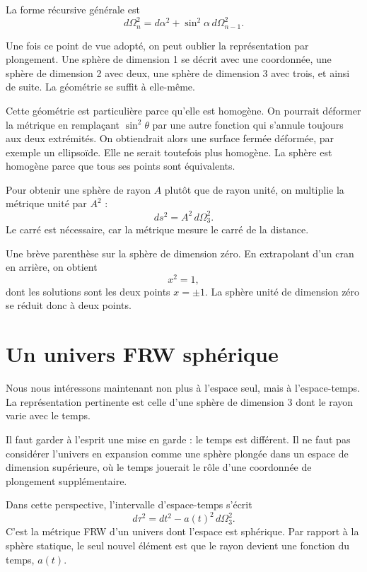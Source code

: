 La forme récursive générale est
\begin{equation}
d\Omega_n^2=d\alpha^2+\sin^2\alpha\,d\Omega_{n-1}^2.
\end{equation}

Une fois ce point de vue adopté, on peut oublier la représentation par plongement. Une sphère de dimension 1 se décrit avec une coordonnée, une sphère de dimension 2 avec deux, une sphère de dimension 3 avec trois, et ainsi de suite. La géométrie se suffit à elle-même.

Cette géométrie est particulière parce qu’elle est homogène. On pourrait déformer la métrique en remplaçant \(\sin^2\theta\) par une autre fonction qui s’annule toujours aux deux extrémités. On obtiendrait alors une surface fermée déformée, par exemple un ellipsoïde. Elle ne serait toutefois plus homogène. La sphère est homogène parce que tous ses points sont équivalents.

Pour obtenir une sphère de rayon \(A\) plutôt que de rayon unité, on multiplie la métrique unité par \(A^2\) :
\begin{equation}
ds^2=A^2\,d\Omega_3^2.
\end{equation}
Le carré est nécessaire, car la métrique mesure le carré de la distance.

Une brève parenthèse sur la sphère de dimension zéro. En extrapolant d’un cran en arrière, on obtient
\begin{equation}
x^2=1,
\end{equation}
dont les solutions sont les deux points \(x=\pm 1\). La sphère unité de dimension zéro se réduit donc à deux points.

\section{Un univers FRW sphérique}

Nous nous intéressons maintenant non plus à l’espace seul, mais à l’espace-temps. La représentation pertinente est celle d’une sphère de dimension 3 dont le rayon varie avec le temps.

Il faut garder à l’esprit une mise en garde : le temps est différent. Il ne faut pas considérer l’univers en expansion comme une sphère plongée dans un espace de dimension supérieure, où le temps jouerait le rôle d’une coordonnée de plongement supplémentaire.

Dans cette perspective, l’intervalle d’espace-temps s’écrit
\begin{equation}
d\tau^2=dt^2-a(t)^2\,d\Omega_3^2.
\end{equation}
C’est la métrique FRW d’un univers dont l’espace est sphérique. Par rapport à la sphère statique, le seul nouvel élément est que le rayon devient une fonction du temps, \(a(t)\).

